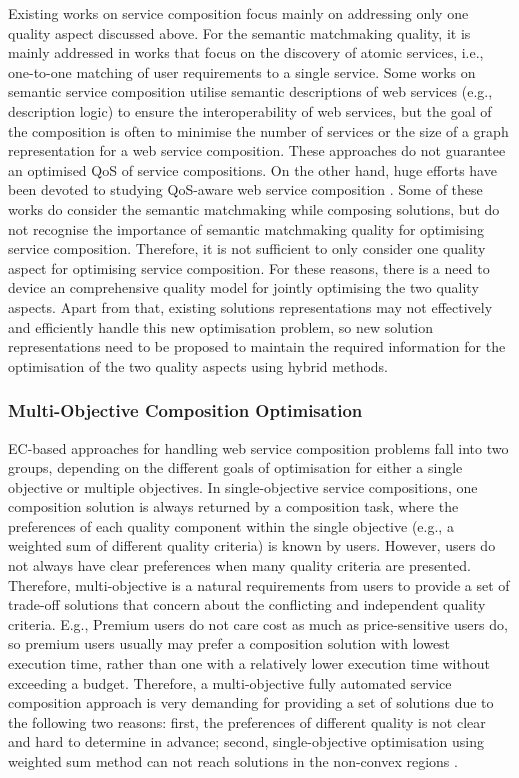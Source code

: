 Existing works on service composition focus mainly on addressing only one quality aspect discussed above. For the semantic matchmaking quality, it is mainly addressed in works that focus on the discovery of atomic services, i.e., one-to-one matching of user requirements to a single service. Some works \cite{bansal2016generalized,boustil2014semantic,mier2015integrated} on semantic service composition utilise semantic descriptions of web services (e.g., description logic) to ensure the interoperability of web services, but the goal of the composition is often to minimise the number of services or the size of a graph representation for a web service composition. These approaches do not guarantee an optimised QoS of service compositions. On the other hand, huge efforts have been devoted to studying QoS-aware web service composition \cite{da2015graphevol,da2016particle,gupta2015optimization,ma2015hybrid,qi2010combining,yu2013adaptive}. Some of these works do consider the semantic matchmaking while composing solutions, but do not recognise the importance of semantic matchmaking quality for optimising service composition. Therefore, it is not sufficient to only consider one quality aspect for optimising service composition. For these reasons, there is a need to device an comprehensive quality model for jointly optimising the two quality aspects. Apart from that, existing solutions representations may not effectively and efficiently handle this new optimisation problem, so new solution representations need to be proposed to maintain the required information for the optimisation of the two quality aspects using hybrid methods. 


\subsubsection{Multi-Objective Composition Optimisation}
EC-based approaches for handling web service composition problems fall into two groups, depending on the different goals of optimisation for either a single objective or multiple objectives. In single-objective service compositions, one composition solution is always returned by a composition task, where the preferences of each quality component within the single objective (e.g., a weighted sum of different quality criteria) is known by users. However, users do not always have clear preferences when many quality criteria are presented. Therefore, multi-objective is a natural requirements from users to provide a set of trade-off solutions that concern about the conflicting and independent quality criteria. E.g., Premium users do not care cost as much as price-sensitive users do, so premium users usually may prefer a composition solution with lowest execution time,  rather than one with a relatively lower execution time without exceeding a budget. Therefore, a multi-objective  fully automated service composition approach is very demanding for providing a set of solutions due to the following two reasons: first, the preferences of different quality is not clear and hard to determine in advance; second, single-objective optimisation using weighted sum method can not reach solutions in the non-convex regions \cite{kim2006adaptive}.  

